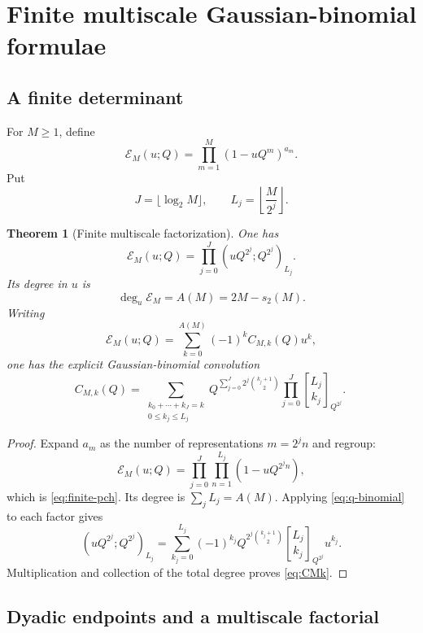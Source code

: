 \documentclass[11pt,oneside]{article}
\numberwithin{equation}{section}
\theoremstyle{plain}
\newtheorem{theorem}{Theorem}[section]
\theoremstyle{definition}
\theoremstyle{remark}
\newcommand{\Ecal}{\mathscr E}
\newcommand{\qbinom}[3]{\genfrac{[}{]}{0pt}{}{#1}{#2}_{#3}}
\begin{document}
\section{Finite multiscale Gaussian-binomial formulae}

\subsection{A finite determinant}

For $M\ge1$, define
\begin{equation}\label{eq:EM}
 \Ecal_M(u;Q)=\prod_{m=1}^{M}(1-uQ^m)^{a_m}.
\end{equation}
Put
\[
 J=\lfloor\log_2M\rfloor,
 \qquad
 L_j=\left\lfloor\frac{M}{2^j}\right\rfloor.
\]

\begin{theorem}[Finite multiscale factorization]\label{thm:finite-E}
One has
\begin{equation}\label{eq:finite-pch}
 \boxed{\ \Ecal_M(u;Q)
 =\prod_{j=0}^{J}(uQ^{2^j};Q^{2^j})_{L_j}.\ }
\end{equation}
Its degree in $u$ is
\begin{equation}\label{eq:EM-degree}
 \deg_u\Ecal_M=A(M)=2M-s_2(M).
\end{equation}
Writing
\begin{equation}\label{eq:EM-coeff-def}
 \Ecal_M(u;Q)=\sum_{k=0}^{A(M)}(-1)^kC_{M,k}(Q)u^k,
\end{equation}
one has the explicit Gaussian-binomial convolution
\begin{equation}\label{eq:CMk}
 \boxed{
 C_{M,k}(Q)=
 \sum_{\substack{k_0+\cdots+k_J=k\\0\le k_j\le L_j}}
 Q^{\sum_{j=0}^{J}2^j\binom{k_j+1}{2}}
 \prod_{j=0}^{J}\qbinom{L_j}{k_j}{Q^{2^j}}.\ }
\end{equation}
\end{theorem}

\begin{proof}
Expand $a_m$ as the number of representations $m=2^jn$ and regroup:
\[
 \Ecal_M(u;Q)
 =\prod_{j=0}^{J}\prod_{n=1}^{L_j}(1-uQ^{2^jn}),
\]
which is \cref{eq:finite-pch}.  Its degree is $\sum_jL_j=A(M)$.  Applying \cref{eq:q-binomial} to each factor gives
\[
 (uQ^{2^j};Q^{2^j})_{L_j}
 =\sum_{k_j=0}^{L_j}(-1)^{k_j}
 Q^{2^j\binom{k_j+1}{2}}
 \qbinom{L_j}{k_j}{Q^{2^j}}u^{k_j}.
\]
Multiplication and collection of the total degree proves \cref{eq:CMk}.
\end{proof}

\subsection{Dyadic endpoints and a multiscale factorial}
\end{document}
